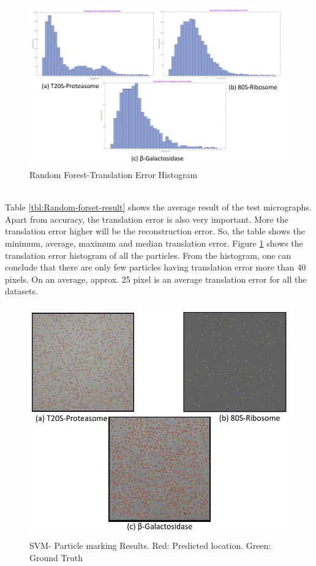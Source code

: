 \documentclass[twoside]{iitbreport}
\begin{document}
\begin{figure}[H]
\includegraphics[width=1\linewidth]{rf-all-Translation_Error_Histogram.png}
\centering
\captionsetup{justification=centering}
\caption{Random Forest-Translation Error Histogram}
\label{fig: RF-Translation_Error_Histogram}
\end{figure}

\noindent\\
Table \ref{tbl:Random-forset-result} shows the average result of the test micrographs. Apart from accuracy, the translation error is also very important. More the translation error higher will be the reconstruction error. So, the table shows the minimum, average, maximum and median translation error. Figure \ref{fig: RF-Translation_Error_Histogram} shows the translation error histogram of all the particles. From the histogram, one can conclude that there are only few particles having translation error more than 40 pixels. On an average, approx. 25 pixel is an average translation error for all the datasets. 

\begin{figure}[H]
\includegraphics[width=0.98\linewidth,height=10cm]{rf-all-result.png}
\centering
\captionsetup{justification=centering}
\caption{SVM- Particle marking Results. Red: Predicted location. Green: Ground Truth}
\label{fig:RF-micrograph-marking}
\end{figure}
\end{document}
